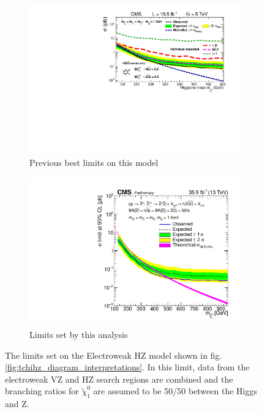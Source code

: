     \begin{figure}[!h]
      \centering
        \begin{subfigure}[b]{0.4\textwidth}
          \label{fig:t5zz_interpretations_2015}
          \includegraphics[width=\textwidth]{figures/interpretations/TChiHZ_previous_best.pdf}
          \caption{Previous best limits on this model}
        \end{subfigure}
        \begin{subfigure}[b]{0.4\textwidth}
          \label{fig:t5zz_interpretations_current}
          \includegraphics[width=\textwidth]{figures/interpretations/TChiHZ_0p25ZZ_Exclusion_13TeV.pdf}
          \caption{Limits set by this analysis}
        \end{subfigure}
      \caption{ \label{fig:tchihz_interpretation}
        The limits set on the Electroweak HZ model shown in fig. \ref{fig:tchihz_diagram_interpretations}. In this limit, data from the electroweak VZ and HZ search regions are combined and the branching ratios for $\widetilde{\chi}^0_1$ are assumed to be 50/50 between the Higgs and Z.
      }
    \end{figure}

